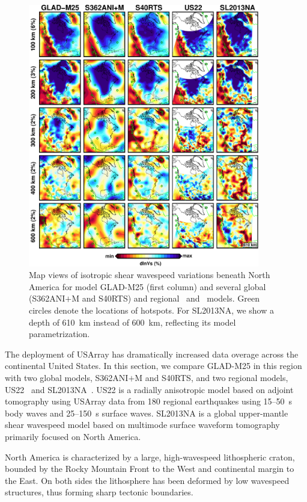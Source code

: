 \documentclass[extra,mreferee]{gji}
\begin{document}
\begin{figure}
\centering
\includegraphics[width=0.9\textwidth]{figures/depth_slice/america_vs.pdf}
  \caption{\small{Map views of isotropic shear wavespeed variations beneath North America 
  for model GLAD-M25 (first column) and several global (S362ANI$+$M and S40RTS)
  and regional~\citep[US22;][]{zhu2017radial} and~\citep[SL2013NA;][]{schaeffer2014imaging}
  models. Green circles denote the locations of hotspots. For SL2013NA, we
  show a depth of 610~km instead of 600~km, reflecting its model parametrization.}}
\label{fig:america-vs}
\end{figure}

The deployment of USArray has dramatically increased data overage across the
continental United States.
In this section, we compare GLAD-M25 in this region 
with two global models, S362ANI$+$M and S40RTS, and two regional models,
US22~\citep{zhu2017radial} and SL2013NA~\citep{schaeffer2014imaging}.
US22 is a radially anisotropic model based on adjoint tomography using
USArray data from 180 regional earthquakes using 15--50~s
body waves and 25--150~s surface waves.
SL2013NA is a global upper-mantle shear wavespeed model based on multimode
surface waveform tomography primarily focused on North America.

North America is characterized by a large, high-wavespeed lithospheric craton,
bounded by the Rocky Mountain Front to the West and continental
margin to the East. On both sides the lithosphere has been deformed by
low wavespeed structures, thus forming sharp tectonic boundaries.
\end{document}
